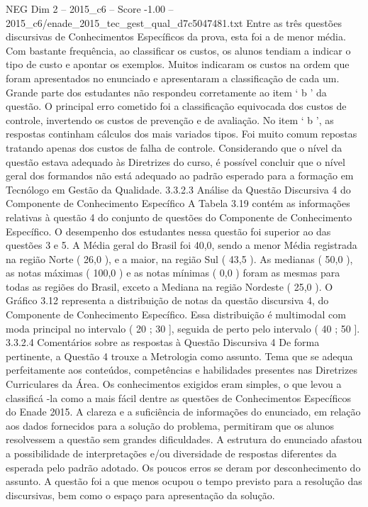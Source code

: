\begin{textsample}{NEG Dim 2 – 2015\_c6 – Score -1.00 – 2015\_c6/enade\_2015\_tec\_gest\_qual\_d7c5047481.txt}
Entre as três questões discursivas de Conhecimentos Específicos da prova, esta foi a de menor média.
Com bastante frequência, ao classificar os custos, os alunos tendiam a indicar o tipo de custo e apontar os exemplos.
Muitos indicaram os custos na ordem que foram apresentados no enunciado e apresentaram a classificação de cada um.
Grande parte dos estudantes não respondeu corretamente ao item ‘ b ’ da questão.
O principal erro cometido foi a classificação equivocada dos custos de controle, invertendo os custos de prevenção e de avaliação.
No item ‘ b ’, as respostas continham cálculos dos mais variados tipos.
Foi muito comum repostas tratando apenas dos custos de falha de controle.
Considerando que o nível da questão estava adequado às Diretrizes do curso, é possível concluir que o nível geral dos formandos não está adequado ao padrão esperado para a formação em Tecnólogo em Gestão da Qualidade. 3.3.2.3 Análise da Questão Discursiva 4 do Componente de Conhecimento Específico A Tabela 3.19 contém as informações relativas à questão 4 do conjunto de questões do Componente de Conhecimento Específico.
O desempenho dos estudantes nessa questão foi superior ao das questões 3 e 5.
A Média geral do Brasil foi 40,0, sendo a menor Média registrada na região Norte ( 26,0 ), e a maior, na região Sul ( 43,5 ).
As medianas ( 50,0 ), as notas máximas ( 100,0 ) e as notas mínimas ( 0,0 ) foram as mesmas para todas as regiões do Brasil, exceto a Mediana na região Nordeste ( 25,0 ).
O Gráfico 3.12 representa a distribuição de notas da questão discursiva 4, do Componente de Conhecimento Específico.
Essa distribuição é multimodal com moda principal no intervalo ( 20 ; 30 ], seguida de perto pelo intervalo ( 40 ; 50 ]. 3.3.2.4 Comentários sobre as respostas à Questão Discursiva 4 De forma pertinente, a Questão 4 trouxe a Metrologia como assunto.
Tema que se adequa perfeitamente aos conteúdos, competências e habilidades presentes nas Diretrizes Curriculares da Área.
Os conhecimentos exigidos eram simples, o que levou a classificá -la como a mais fácil dentre as questões de Conhecimentos Específicos do Enade 2015.
A clareza e a suficiência de informações do enunciado, em relação aos dados fornecidos para a solução do problema, permitiram que os alunos resolvessem a questão sem grandes dificuldades.
A estrutura do enunciado afastou a possibilidade de interpretações e/ou diversidade de respostas diferentes da esperada pelo padrão adotado.
Os poucos erros se deram por desconhecimento do assunto.
A questão foi a que menos ocupou o tempo previsto para a resolução das discursivas, bem como o espaço para apresentação da solução.

\end{textsample}
